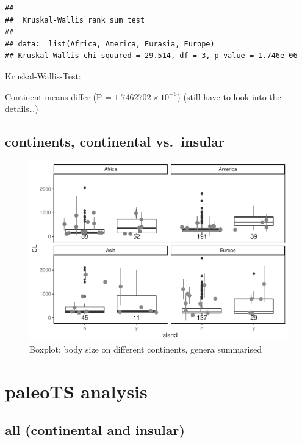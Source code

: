 \documentclass[]{article}
\begin{document}
\begin{verbatim}
## 
##  Kruskal-Wallis rank sum test
## 
## data:  list(Africa, America, Eurasia, Europe)
## Kruskal-Wallis chi-squared = 29.514, df = 3, p-value = 1.746e-06
\end{verbatim}

Kruskal-Wallis-Test:

Continent means differ (P = \(1.7462702\times 10^{-6}\)) (still have to
look into the details\ldots{})

\newpage

\subsection{continents, continental
vs.~insular}\label{continents-continental-vs.insular}

\begin{figure}[htbp]
\centering
\includegraphics{MA_JJ_files/figure-latex/Boxplot body size split into continents, continental vs. insular-1.pdf}
\caption{Boxplot: body size on different continents, genera summarised}
\end{figure}

\newpage

\section{paleoTS analysis}\label{paleots-analysis}

\subsection{all (continental and
insular)}\label{all-continental-and-insular}
\end{document}
